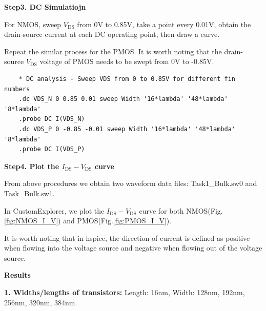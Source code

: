 \documentclass[UTF8,12pt,a4paper]{article}
\begin{document}
\textbf{Step3. DC Simulatiojn}

For NMOS, sweep $V_{\text{DS}}$ from 0V to 0.85V, take a point every 0.01V, obtain the drain-source current at each DC operating point, then draw a curve.

Repeat the similar process for the PMOS. It is worth noting that the drain-source $V_{\text{DS}}$ voltage of PMOS needs to be swept from 0V to -0.85V.
\begin{lstlisting}
	* DC analysis - Sweep VDS from 0 to 0.85V for different fin numbers
	.dc VDS_N 0 0.85 0.01 sweep Width '16*lambda' '48*lambda' '8*lambda'
	.probe DC I(VDS_N) 
	.dc VDS_P 0 -0.85 -0.01 sweep Width '16*lambda' '48*lambda' '8*lambda'
	.probe DC I(VDS_P)
\end{lstlisting}

\textbf{Step4. Plot the $I_{\text{DS}}-V_{\text{DS}}$ curve}

From above procedures we obtain two waveform data files: Task1\_Bulk.sw0 and Task\_Bulk.sw1.

In CustomExplorer, we plot the $I_{\text{DS}}-V_{\text{DS}}$ curve for both NMOS(Fig.\ref{fig:NMOS_I_V}) and PMOS(Fig.\ref{fig:PMOS_I_V}). 

It is worth noting that in hspice, the direction of current is defined as positive when flowing into the voltage source and negative when flowing out of the voltage source.

\textbf{Results}

\textbf{1. Widths/lengths of transistors:} Length: 16nm, Width: 128nm, 192nm, 256nm, 320nm, 384nm.
\end{document}
